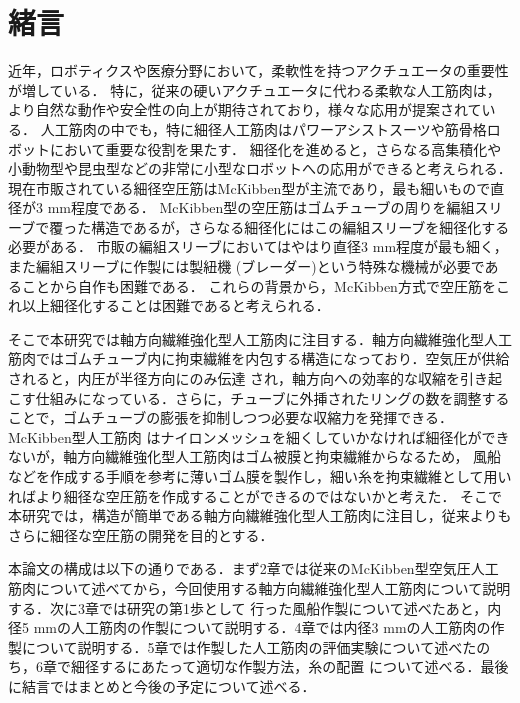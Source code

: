 \newpage
\setcounter{page}{1}
\section{緒言}
近年，ロボティクスや医療分野において，柔軟性を持つアクチュエータの重要性が増している\cite{Hauser}．
特に，従来の硬いアクチュエータに代わる柔軟な人工筋肉は，より自然な動作や安全性の向上が期待されており，様々な応用が提案されている\cite{21}．
人工筋肉の中でも，特に細径人工筋肉はパワーアシストスーツや筋骨格ロボットにおいて重要な役割を果たす\cite{11}．
細径化を進めると，さらなる高集積化や小動物型や昆虫型などの非常に小型なロボットへの応用ができると考えられる\cite{mi14071431}．
現在市販されている細径空圧筋はMcKibben型が主流であり，最も細いもので直径が3 mm程度である．
McKibben型の空圧筋はゴムチューブの周りを編組スリーブで覆った構造であるが，さらなる細径化にはこの編組スリーブを細径化する必要がある．
市販の編組スリーブにおいてはやはり直径3 mm程度が最も細く，また編組スリーブに作製には製紐機 (ブレーダー)という特殊な機械が必要であることから自作も困難である．
これらの背景から，McKibben方式で空圧筋をこれ以上細径化することは困難であると考えられる．

そこで本研究では軸方向繊維強化型人工筋肉に注目する．軸方向繊維強化型人工筋肉ではゴムチューブ内に拘束繊維を内包する構造になっており．空気圧が供給されると，内圧が半径方向にのみ伝達
され，軸方向への効率的な収縮を引き起こす仕組みになっている．さらに，チューブに外挿されたリングの数を調整することで，ゴムチューブの膨張を抑制しつつ必要な収縮力を発揮できる\cite{22}．McKibben型人工筋肉
はナイロンメッシュを細くしていかなければ細径化ができないが，軸方向繊維強化型人工筋肉はゴム被膜と拘束繊維からなるため，
風船などを作成する手順を参考に薄いゴム膜を製作し，細い糸を拘束繊維として用いればより細径な空圧筋を作成することができるのではないかと考えた．
そこで本研究では，構造が簡単である軸方向繊維強化型人工筋肉に注目し，従来よりもさらに細径な空圧筋の開発を目的とする．

本論文の構成は以下の通りである．まず2章では従来のMcKibben型空気圧人工筋肉について述べてから，今回使用する軸方向繊維強化型人工筋肉について説明する．次に3章では研究の第1歩として
行った風船作製について述べたあと，内径5 mmの人工筋肉の作製について説明する．4章では内径3 mmの人工筋肉の作製について説明する．5章では作製した人工筋肉の評価実験について述べたのち，6章で細径するにあたって適切な作製方法，糸の配置
について述べる．最後に結言ではまとめと今後の予定について述べる．
